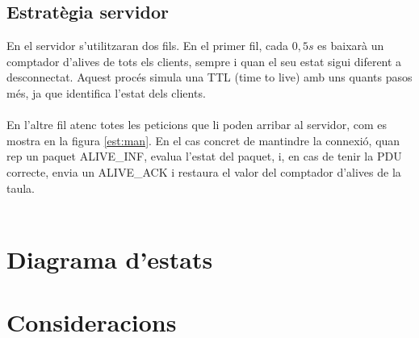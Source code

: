 \documentclass{article}
\begin{document}
\subsection{Estratègia servidor}
En el servidor s'utilitzaran dos fils. En el primer fil, cada $0,5s$ es baixarà 
un comptador d'alives de tots els clients, sempre i quan el seu estat sigui 
diferent a desconnectat. Aquest procés simula una TTL (time to live) amb uns quants
pasos més, ja que identifica l'estat dels clients.\\
\\
En l'altre fil atenc totes les peticions que li poden arribar al servidor, com es mostra
en la figura \ref{est:man}. En el cas concret de mantindre la connexió, quan rep un
paquet ALIVE\_INF, evalua l'estat del paquet, i, en cas de tenir la PDU correcte, envia
un ALIVE\_ACK i restaura el valor del comptador d'alives de la taula.\\
\\
\section{Diagrama d'estats}
\section{Consideracions}
\end{document}
